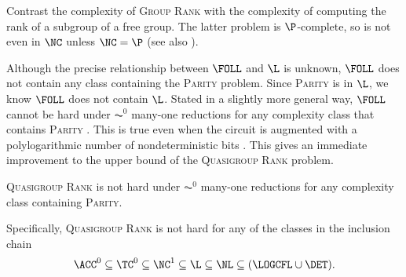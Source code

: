 \documentclass{article}
\begin{document}
Contrast the complexity of \textsc{Group Rank} with the complexity of computing the rank of a subgroup of a free group.
The latter problem is $\P$-complete, so is not even in $\NC$ unless $\NC = \P$ \autocite[Theorem~4.9]{am84} (see also \autocite[Problem~A.8.11]{ghr95}).

Although the precise relationship between $\FOLL$ and $\L$ is unknown, $\FOLL$ does not contain any class containing the \textsc{Parity} problem.
Since \textsc{Parity} is in $\L$, we know $\FOLL$ does not contain $\L$.
Stated in a slightly more general way, $\FOLL$ cannot be hard under $\AC^0$ many-one reductions for any complexity class that contains \textsc{Parity} \cite[Proposition~2.1]{bklm01}.
This is true even when the circuit is augmented with a polylogarithmic number of nondeterministic bits \cite[Section~4]{ctw13}.
This gives an immediate improvement to the upper bound of the \textsc{Quasigroup Rank} problem.

\begin{theorem}
  \textsc{Quasigroup Rank} is not hard under $\AC^0$ many-one reductions for any complexity class containing \textsc{Parity}.
\end{theorem}

Specifically, \textsc{Quasigroup Rank} is not hard for any of the classes in the inclusion chain
\begin{equation*}
  \ACC^0 \subseteq \TC^0 \subseteq \NC^1 \subseteq \L \subseteq \NL \subseteq (\LOGCFL \cup \DET).
\end{equation*}

\printbibliography
\end{document}
